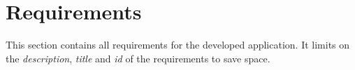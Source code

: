 \chapter{Requirements}
\label{app:RE}

This section contains all requirements for the developed application. It limits on the \textit{description}, \textit{title} and \textit{id} of the requirements to save space.
